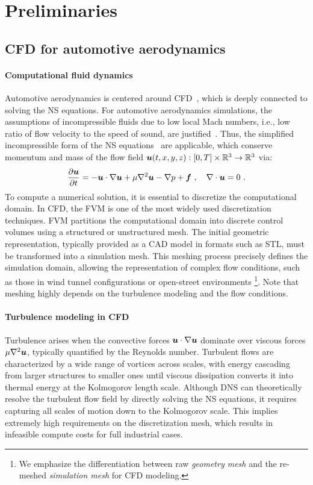 \section{Preliminaries}
\label{sec:background}
\subsection{CFD for automotive aerodynamics}
\label{subsec:cfd_for_automotive}
\paragraph{Computational fluid dynamics}
Automotive aerodynamics is centered around \acf{CFD}~\cite{versteeg2007introduction, hirsch2007numerical,pletcher2012computational}, which is deeply connected to solving the \acf{NS} equations. 
For automotive aerodynamics simulations, the assumptions of incompressible fluids due to low local Mach numbers, i.e., low ratio of flow velocity to the speed of sound, are justified~\cite{ashton2024drivaerml}.
Thus, the simplified incompressible form of the \ac{NS} equations~\citep{Temam:01} are applicable, which conserve momentum and mass of the flow field 
$\bm{u}(t,x,y,z): [0,T] \times \mathbb{R}^3 \rightarrow \mathbb{R}^3$ via:
\begin{align}
\frac{\partial \bm{u}}{\partial t} = -\bm{u} \cdot \nabla \bm{u} + \mu \nabla^2 \bm{u} - \nabla p + \bm{f} \ , \quad
\nabla \cdot \bm{u} = 0 \ .
\end{align}
To compute a numerical solution, it is essential to discretize the computational domain. 
In \ac{CFD}, the \ac{FVM}  is one of the most widely used discretization techniques. 
\Ac{FVM} partitions the computational domain into discrete control volumes using a structured or unstructured mesh. 
The initial geometric representation, typically provided as a \ac{CAD} model in formats such as STL, must be transformed into a simulation mesh. 
This meshing process precisely defines the simulation domain, allowing the representation of complex flow conditions, such as those in wind tunnel configurations or open-street environments \footnote{We emphasize the differentiation between raw \emph{geometry mesh} and the re-meshed \emph{simulation mesh} for CFD modeling.}. 
Note that meshing highly depends on the turbulence modeling and the flow conditions.

\paragraph{Turbulence modeling in CFD} 
Turbulence arises when the convective forces $\bm{u} \cdot \nabla \bm{u}$ dominate over viscous forces $\mu \nabla^2 \bm{u}$, typically quantified by the Reynolds number. 
Turbulent flows are characterized by a wide range of vortices across scales, with energy cascading from larger structures to smaller ones until viscous dissipation converts it into thermal energy at the Kolmogorov length scale.
Although \ac{DNS} can theoretically resolve the turbulent flow field by directly solving the \ac{NS} equations, it requires capturing all scales of motion down to the Kolmogorov scale. 
This implies extremely high requirements on the discretization mesh, which results in infeasible compute costs for full industrial cases.

